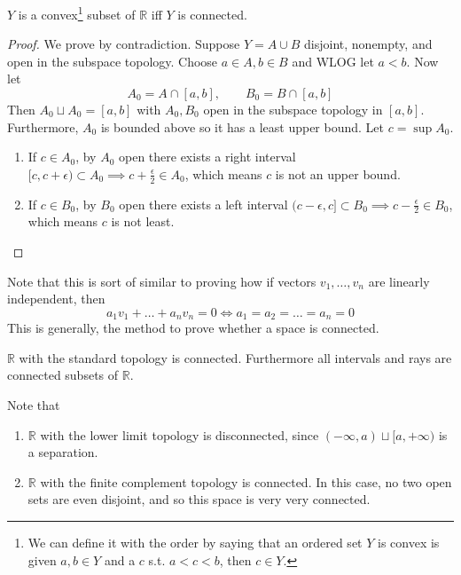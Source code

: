  \begin{theorem}
    $Y$ is a convex\footnote{We can define it with the order by saying that an ordered set $Y$ is convex is given $a, b \in Y$ and a $c$ s.t. $a < c < b$, then $c \in Y$.} subset of $\mathbb{R}$ iff $Y$ is connected. 
  \end{theorem}
  \begin{proof}
    We prove by contradiction. Suppose $Y = A \cup B$ disjoint, nonempty, and open in the subspace topology. Choose $a \in A, b \in B$ and WLOG let $a < b$. Now let 
    \begin{equation}
      A_0 = A \cap [a, b], \qquad B_0 = B \cap [a, b]
    \end{equation}
    Then $A_0 \sqcup A_0 = [a, b]$ with $A_0, B_0$ open in the subspace topology in $[a, b]$. Furthermore, $A_0$ is bounded above so it has a least upper bound. Let $c = \sup{A_0}$. 
    \begin{enumerate}
      \item If $c \in A_0$, by $A_0$ open there exists a right interval $[c, c + \epsilon) \subset A_0 \implies c + \frac{\epsilon}{2} \in A_0$, which means $c$ is not an upper bound. 
      \item If $c \in B_0$, by $B_0$ open there exists a left interval $(c - \epsilon, c] \subset B_0 \implies c - \frac{\epsilon}{2} \in B_0 $, which means $c$ is not least. 
    \end{enumerate}
  \end{proof}
  
  Note that this is sort of similar to proving how if vectors $v_1, \ldots, v_n$ are linearly independent, then 
  \begin{equation}
    a_1 v_1 + \ldots + a_n v_n = 0 \iff a_1 = a_2 = \ldots = a_n = 0
  \end{equation}
  This is generally, the method to prove whether a space is connected. 

  \begin{corollary}
    $\mathbb{R}$ with the standard topology is connected. Furthermore all intervals and rays are connected subsets of $\mathbb{R}$. 
  \end{corollary} 

  \begin{example}
    Note that 
    \begin{enumerate}
      \item $\mathbb{R}$ with the lower limit topology is disconnected, since $(-\infty, a) \sqcup [a, +\infty)$ is a separation. 
      \item $\mathbb{R}$ with the finite complement topology is connected. In this case, no two open sets are even disjoint, and so this space is very very connected. 
    \end{enumerate}
  \end{example}

